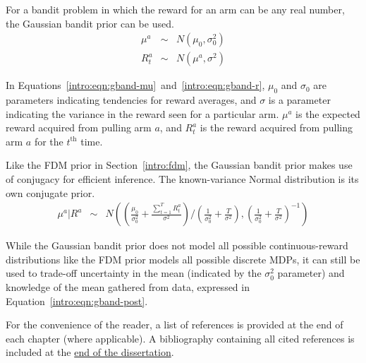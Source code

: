 For a bandit problem in which the reward for an arm can be any real number, the Gaussian bandit prior can be used.
\begin{eqnarray}
\label{intro:eqn:gband-mu}\mu^a &\sim& N(\mu_0, \sigma^2_0)\\
\label{intro:eqn:gband-r}R_t^a &\sim& N(\mu^a, \sigma^2)
\end{eqnarray}

In Equations~\ref{intro:eqn:gband-mu}~and~\ref{intro:eqn:gband-r}, $\mu_0$ and $\sigma_0$ are parameters indicating tendencies for reward averages, and $\sigma$ is a parameter indicating the variance in the reward seen for a particular arm. $\mu^a$ is the expected reward acquired from pulling arm $a$, and $R_t^a$ is the reward acquired from pulling arm $a$ for the $t^{\mbox{th}}$ time.

Like the FDM prior in Section~\ref{intro:fdm}, the Gaussian bandit prior makes use of conjugacy for efficient inference. The known-variance Normal distribution is its own conjugate prior.
\begin{eqnarray}
\label{intro:eqn:gband-post}\mu^a|R^a &\sim& N\left(\left(\frac{\mu_0}{\sigma_0^2} + \frac{\sum_{t=1}^T R_t^a}{\sigma^2}\right)/\left(\frac 1 {\sigma_0^2} + \frac T {\sigma^2} \right), \left(\frac 1 {\sigma_0^2} + \frac T {\sigma^2} \right)^{-1}\right)
\end{eqnarray}

While the Gaussian bandit prior does not model all possible continuous-reward distributions like the FDM prior models all possible discrete MDPs, it can still be used to trade-off uncertainty in the mean (indicated by the $\sigma_0^2$ parameter) and knowledge of the mean gathered from data, expressed in Equation~\ref{intro:eqn:gband-post}.

%
\ifperchapterbib%
For the convenience of the reader, a list of references is provided at the end of each chapter (where applicable).
\ifendbib%
A bibliography containing all cited references is included at the \hyperref[sec:bibliography]{end of the dissertation}.
\else\fi%
\cbend%
\else\fi%